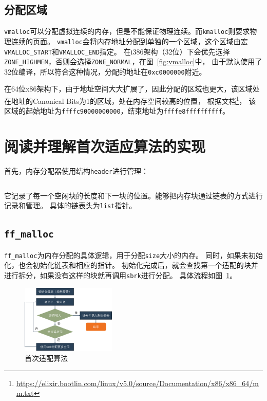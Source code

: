 \documentclass[a4paper,twoside]{article}
\begin{document}
\begin{spacing}{1.2}
\subsection{分配区域}

\texttt{vmalloc}可以分配虚拟连续的内存，但是不能保证物理连续。而\texttt{kmalloc}则要求物理连续的页面。
\texttt{vmalloc}会将内存地址分配到单独的一个区域，这个区域由宏\texttt{VMALLOC\_START}和\texttt{VMALLOC\_END}指定。
在i386架构（32位）下会优先选择\texttt{ZONE\_HIGHMEM}，否则会选择\texttt{ZONE\_NORMAL}，在图~\ref{fig:vmalloc}中，
由于默认使用了32位编译，所以符合这种情况，分配的地址在\texttt{0xc0000000}附近。

在64位x86架构下，由于地址空间大大扩展了，因此分配的区域也更大，该区域处在地址的Canonical Bits为1的区域，处在内存空间较高的位置，
根据文档\footnote{\url{https://elixir.bootlin.com/linux/v5.0/source/Documentation/x86/x86_64/mm.txt}}，
该区域的起始地址为\texttt{ffffc90000000000}，结束地址为\texttt{ffffe8ffffffffff}。

\section{阅读并理解首次适应算法的实现}

首先，内存分配器使用结构\texttt{header}进行管理：
\inputminted[firstline=10,lastline=18]{c}{../code/3/ff_malloc.c}
它记录了每一个空闲块的长度和下一块的位置。能够把内存块通过链表的方式进行记录和管理。
具体的链表头为\texttt{list}指针。

\subsection{\texttt{ff\_malloc}}

\texttt{ff\_malloc}为内存分配的具体逻辑，用于分配\texttt{size}大小的内存。
同时，如果未初始化，也会初始化链表和相应的指针。
初始化完成后，就会查找第一个适配的块并进行拆分，如果没有这样的块就再调用\texttt{sbrk}进行分配。
具体流程如图~\ref{fig:ff}。

\begin{figure}[htb]
	\centering
	\caption{首次适配算法}
	\label{fig:ff}
	\includegraphics[width=0.4\textwidth]{images/ff.png}
\end{figure}



\end{spacing}
\end{document}
